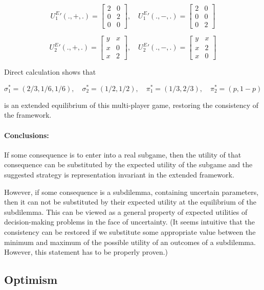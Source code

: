 \documentclass{article}
\begin{document}
\[
{U^E_1}'(.,+,.)=
\begin{bmatrix}
2 & 0 \\
0 & 2 \\
0 & 0
\end{bmatrix}, \quad
{U^E_1}'(.,-,.)=
\begin{bmatrix}
2 & 0 \\
0 & 0 \\
0 & 2
\end{bmatrix}
\]

\[
{U^E_2}'(.,+,.)=
\begin{bmatrix}
y & x \\
x & 0 \\
x & 2
\end{bmatrix}, \quad
{U^E_2}'(.,-,.)=
\begin{bmatrix}
y & x \\
x & 2 \\
x & 0
\end{bmatrix}
\]

Direct calculation shows that

\[
\sigma_1^*=(2/3,1/6,1/6), \quad
\sigma_2^*=(1/2,1/2), \quad
\pi_1^*=(1/3,2/3), \quad
\pi_2^*=(p,1-p)
\]

is an extended equilibrium of this multi-player game, restoring the consistency of the framework.

\paragraph{Conclusions:}
If some consequence is to enter into a real subgame, then the utility of that consequence can be substituted by the expected utility of the subgame and
the suggested strategy is representation invariant in the extended framework.

However, if some consequence is a subdilemma, containing uncertain parameters, then it can not be substituted by their expected utility at the equilibrium of the subdilemma. This can be viewed as a general property of expected utilities of decision-making problems in the face of uncertainty.
(It seems intuitive that the consistency can be restored if we substitute some appropriate value between the minimum and maximum of the possible utility of an outcomes of a subdilemma. However, this statement has to be properly proven.)

\subsection*{Optimism}
\end{document}
